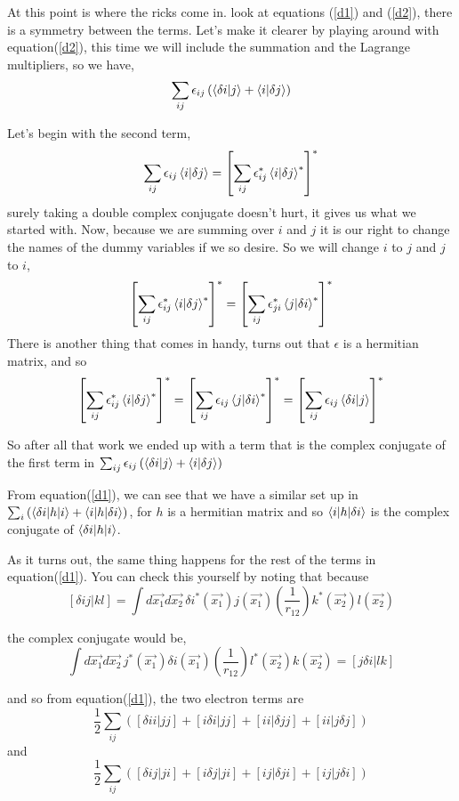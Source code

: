 \documentclass[a4paper]{article}
\begin{document}
At this point is where the ricks come in.
look at equations (\ref{d1}) and (\ref{d2}), there is a symmetry between the terms.
Let's make it clearer by playing around with equation(\ref{d2}), this time we will include the summation and the Lagrange multipliers, so we have,
$$
\sum_{ij} \epsilon_{ij} \left( \braket{\delta i | j} + \braket{i | \delta j} \right)
$$

Let's begin with the second term,
$$
\sum_{ij} \epsilon_{ij} \braket{i | \delta j} = \left[ \sum_{ij} \epsilon^{*}_{ij} \braket{i | \delta j}^* \right]^*
$$
surely taking a double complex conjugate doesn't hurt, it gives us what we started with.
Now, because we are summing over $i$ and $j$ it is our right to change the names of the dummy variables if we so desire. So we will change $i$ to $j$ and $j$ to $i$,
$$
\left[ \sum_{ij} \epsilon^{*}_{ij} \braket{i | \delta j}^* \right]^* = \left[ \sum_{ij} \epsilon^{*}_{ji} \braket{j | \delta i}^* \right]^*
$$
There is another thing that comes in handy, turns out that \textbf{$\epsilon$} is a hermitian matrix, and so
$$
\left[ \sum_{ij} \epsilon^{*}_{ij} \braket{i | \delta j}^* \right]^* = 
\left[ \sum_{ij} \epsilon_{ij} \braket{j | \delta i}^* \right]^* =
\left[ \sum_{ij} \epsilon_{ij} \braket{\delta i | j} \right]^*
$$

So after all that work we ended up with a term that is the complex conjugate of the first term in $\sum_{ij} \epsilon_{ij} \left( \braket{\delta i | j} + \braket{i | \delta j} \right)$

From equation(\ref{d1}), we can see that we have a similar set up in $\sum_i \left( \braket{\delta i | h | i} + \braket{i|h|\delta i} \right)$, for $h$ is a hermitian matrix and so $\braket{i|h|\delta i}$ is the complex conjugate of $\braket{\delta i | h | i}$.

As it turns out, the same thing happens for the rest of the terms in equation(\ref{d1}).
You can check this yourself by noting that because
$$
[\delta ij | kl] = \int d\vec{x_1} d\vec{x_2} \, \delta i^{*}(\vec{x_1}) j(\vec{x_1}) \left(\frac{1}{r_{12}}\right) k^{*}(\vec{x_2}) l(\vec{x_2})
$$

the complex conjugate would be,
$$
\int d\vec{x_1} d\vec{x_2} \, j^{*}(\vec{x_1}) \delta i(\vec{x_1}) \left(\frac{1}{r_{12}}\right) l^{*}(\vec{x_2}) k(\vec{x_2})
= [j \delta i| lk]
$$

and so from equation(\ref{d1}), the two electron terms are
\begin{equation} \label{ex1}
\frac{1}{2}\sum_{ij} \left( [\delta i i | jj] + [i \delta i | jj] + [i i |\delta jj] + [ii | j\delta j]\right)
\end{equation}
and
\begin{equation} \label{ex2}
\frac{1}{2}\sum_{ij} \left( [\delta i j | ji] + [i \delta j | ji] + [i j |\delta ji] + [ij | j\delta i]\right)
\end{equation}
\end{document}
